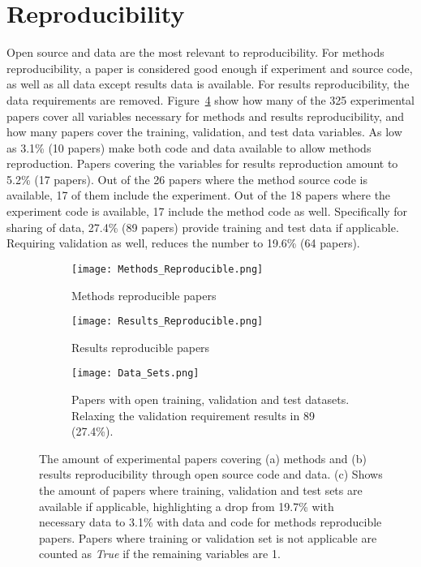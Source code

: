 \section{Reproducibility}
\label{sec:reproducibility-results}
Open source and data are the most relevant to reproducibility. For methods reproducibility, a paper is considered good enough if experiment and source code, as well as all data except results data is available. For results reproducibility, the data requirements are removed. Figure~\ref{fig:reproducibility} show how many of the 325 experimental papers cover all variables necessary for methods and results reproducibility, and how many papers cover the training, validation, and test data variables. As low as 3.1\% (10 papers) make both code and data available to allow methods reproduction. Papers covering the variables for results reproduction amount to 5.2\% (17 papers). Out of the 26 papers where the method source code is available, 17 of them include the experiment. Out of the 18 papers where the experiment code is available, 17 include the method code as well. Specifically for sharing of data, 27.4\% (89 papers) provide training and test data if applicable. Requiring validation as well, reduces the number to 19.6\% (64 papers).

\begin{figure}[!htb]
\begin{center}
    \begin{subfigure}[b]{0.4\textwidth}
        \texttt{[image: Methods\_Reproducible.png]}
        \caption{Methods reproducible papers}
        \label{fig:methods_reproducible}
    \end{subfigure}
    \begin{subfigure}[b]{0.4\textwidth}
        \texttt{[image: Results\_Reproducible.png]}
        \caption{Results reproducible papers}
        \label{fig:results_reproducible}
    \end{subfigure}
    \begin{subfigure}[b]{0.4\textwidth}
        \texttt{[image: Data\_Sets.png]}
        \caption{Papers with open training, validation and test datasets. Relaxing the validation requirement results in 89 (27.4\%).}
        \label{fig:data_sets}
    \end{subfigure}
    \caption[Amount of reproducible papers.]{The amount of experimental papers covering (a) methods and (b) results reproducibility through open source code and data. (c) Shows the amount of papers where training, validation and test sets are available if applicable, highlighting a drop from 19.7\% with necessary data to 3.1\% with data and code for methods reproducible papers. Papers where training or validation set is not applicable are counted as \emph{True} if the remaining variables are 1.}
    \label{fig:reproducibility}
\end{center}
\end{figure}

\cleardoublepage
